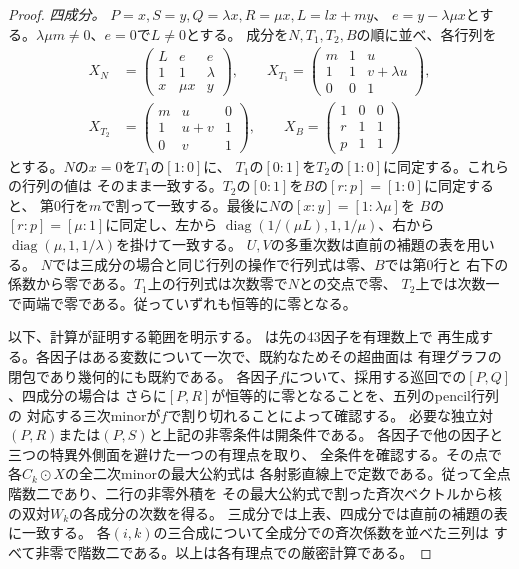 \begin{proof}
\emph{四成分。} $P=x,S=y,Q=\lambda x,R=\mu x,L=l x+m y$、
$e=y-\lambda\mu x$とする。$\lambda\mu m\ne0$、$e=0$で$L\ne0$とする。
成分を$N,T_1,T_2,B$の順に並べ、各行列を
\[
\begin{split}
 X_N&=\begin{pmatrix}L&e&e\\1&1&\lambda\\x&\mu x&y\end{pmatrix},\qquad
 X_{T_1}=\begin{pmatrix}m&1&u\\1&1&v+\lambda u\\0&0&1\end{pmatrix},\\
 X_{T_2}&=\begin{pmatrix}m&u&0\\1&u+v&1\\0&v&1\end{pmatrix},\qquad
 X_B=\begin{pmatrix}1&0&0\\r&1&1\\p&1&1\end{pmatrix}
\end{split}
\]
とする。$N$の$x=0$を$T_1$の$[1:0]$に、
$T_1$の$[0:1]$を$T_2$の$[1:0]$に同定する。これらの行列の値は
そのまま一致する。$T_2$の$[0:1]$を$B$の$[r:p]=[1:0]$に同定すると、
第0行を$m$で割って一致する。最後に$N$の$[x:y]=[1:\lambda\mu]$を
$B$の$[r:p]=[\mu:1]$に同定し、左から
$\operatorname{diag}(1/(\mu L),1,1/\mu)$、右から
$\operatorname{diag}(\mu,1,1/\lambda)$を掛けて一致する。
$U,V$の多重次数は直前の補題の表を用いる。
$N$では三成分の場合と同じ行列の操作で行列式は零、$B$では第0行と
右下の係数から零である。$T_1$上の行列式は次数零で$N$との交点で零、
$T_2$上では次数一で両端で零である。従っていずれも恒等的に零となる。

以下、計算が証明する範囲を明示する。
は先の43因子を有理数上で
再生成する。各因子はある変数について一次で、既約なためその超曲面は
有理グラフの閉包であり幾何的にも既約である。
各因子$f$について、採用する巡回での$[P,Q]$、四成分の場合は
さらに$[P,R]$が恒等的に零となることを、五列のpencil行列の
対応する三次minorが$f$で割り切れることによって確認する。
必要な独立対$(P,R)$または$(P,S)$と上記の非零条件は開条件である。
各因子で他の因子と三つの特異外側面を避けた一つの有理点を取り、
全条件を確認する。その点で各$C_k\odot X$の全二次minorの最大公約式は
各射影直線上で定数である。従って全点階数二であり、二行の非零外積を
その最大公約式で割った斉次ベクトルから核の双対$W_k$の各成分の次数を得る。
三成分では上表、四成分では直前の補題の表に一致する。
各$(i,k)$の三合成について全成分での斉次係数を並べた三列は
すべて非零で階数二である。以上は各有理点での厳密計算である。


\end{proof}

